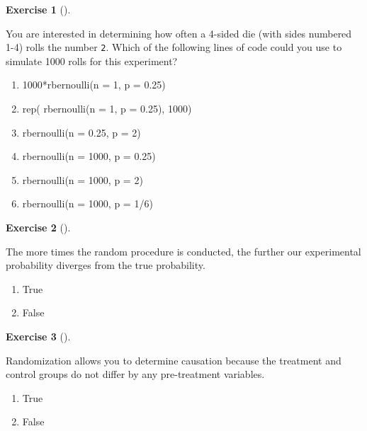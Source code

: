 \documentclass[
  letterpaper,
  DIV=11,
  numbers=noendperiod]{scrreprt}
\providecommand{\tightlist}{%
  \setlength{\itemsep}{0pt}\setlength{\parskip}{0pt}}\usepackage{longtable,booktabs,array}
\theoremstyle{definition}
\newtheorem{exercise}{Exercise}[chapter]
\theoremstyle{remark}
\begin{document}
\begin{exercise}[]\protect\hypertarget{exr-ch07-c02}{}\label{exr-ch07-c02}

You are interested in determining how often a 4-sided die (with sides
numbered 1-4) rolls the number \texttt{2}. Which of the following lines
of code could you use to simulate 1000 rolls for this experiment?

\begin{enumerate}
\def\labelenumi{\alph{enumi})}
\tightlist
\item
  1000*rbernoulli(n = 1, p = 0.25)
\item
  rep( rbernoulli(n = 1, p = 0.25), 1000)
\item
  rbernoulli(n = 0.25, p = 2)
\item
  rbernoulli(n = 1000, p = 0.25)
\item
  rbernoulli(n = 1000, p = 2)
\item
  rbernoulli(n = 1000, p = 1/6)
\end{enumerate}

\end{exercise}

\begin{exercise}[]\protect\hypertarget{exr-ch07-c03}{}\label{exr-ch07-c03}

The more times the random procedure is conducted, the further our
experimental probability diverges from the true probability.

\begin{enumerate}
\def\labelenumi{\alph{enumi})}
\tightlist
\item
  True
\item
  False
\end{enumerate}

\end{exercise}

\begin{exercise}[]\protect\hypertarget{exr-ch07-c04}{}\label{exr-ch07-c04}

Randomization allows you to determine causation because the treatment
and control groups do not differ by any pre-treatment variables.

\begin{enumerate}
\def\labelenumi{\alph{enumi})}
\tightlist
\item
  True
\item
  False
\end{enumerate}

\end{exercise}
\end{document}
